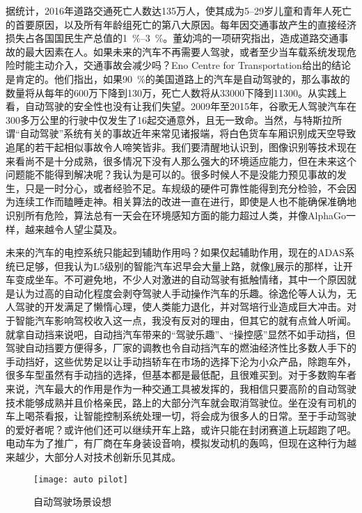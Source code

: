 \documentclass[UTF8]{ctexart}
\numberwithin{figure}{section}
\numberwithin{table}{section}
\begin{document}
据统计，2016年道路交通死亡人数达135万人，使其成为\numrange[range-phrase = $\,\sim\,$]{5}{29}岁儿童和青年人死亡的首要原因，以及所有年龄组死亡的第八大原因。每年因交通事故产生的直接经济损失占各国国民生产总值的\qtyrange[range-phrase = $\,\sim\,$, range-units = single]{1}{3}{\percent}。董幼鸿的一项研究指出，造成道路交通事故的最大因素在人。如果未来的汽车不再需要人驾驶，或者至少当车载系统发现危险时能主动介入，交通事故会减少吗？Eno Centre for Transportation给出的结论是肯定的。他们指出，如果\SI{90}{\percent}的美国道路上的汽车是自动驾驶的，那么事故的数量将从每年的600万下降到130万，死亡人数将从\num[group-separator={,}]{33000}下降到\num[group-separator={,}]{11300}。从实践上看，自动驾驶的安全性也没有让我们失望。2009年至2015年，谷歌无人驾驶汽车在300多万公里的行驶中仅发生了16起交通意外，且无一致命。当然，与特斯拉所谓“自动驾驶”系统有关的事故近年来常见诸报端，将白色货车车厢识别成天空导致追尾的若干起相似事故令人啼笑皆非。我们要清醒地认识到，图像识别等技术现在来看尚不是十分成熟，很多情况下没有人那么强大的环境适应能力，但在未来这个问题能不能得到解决呢？我认为是可以的。很多时候人不是没能力预见事故的发生，只是一时分心，或者经验不足。车规级的硬件可靠性能得到充分检验，不会因为连续工作而瞌睡走神。相关算法的改进一直在进行，即使是人也不能确保准确地识别所有危险，算法总有一天会在环境感知方面的能力超过人类，并像AlphaGo一样，越来越令人望尘莫及。

未来的汽车的电控系统只能起到辅助作用吗？如果仅起辅助作用，现在的ADAS系统已足够，但我认为L5级别的智能汽车迟早会大量上路，就像\cref{auto pilot}展示的那样，让开车变成坐车。不可避免地，不少人对激进的自动驾驶有抵触情绪，其中一个原因就是认为过高的自动化程度会剥夺驾驶人手动操作汽车的乐趣。徐逸伦等人认为，无人驾驶的开发满足了懒惰心理，使人类能力退化，并对驾培行业造成巨大冲击。对于智能汽车影响驾校收入这一点，我没有反对的理由，但其它的就有点耸人听闻。就拿自动挡来说吧，自动挡汽车带来的“驾驶乐趣”、“操控感”显然不如手动挡，但驾驶自动挡要方便得多，厂家的调教也令自动挡汽车的燃油经济性比多数人手下的手动挡好，这些优势足以让手动挡轿车在市场的选择下沦为小众产品，除跑车外，很多车型虽然有手动挡的选择，但基本都是最低配，且很难买到。对于多数购车者来说，汽车最大的作用是作为一种交通工具被发挥的，我相信只要高阶的自动驾驶技术能够成熟并且价格亲民，路上的大部分汽车就会取消驾驶位。坐在没有司机的车上喝茶看报，让智能控制系统处理一切，将会成为很多人的日常。至于手动驾驶的爱好者呢？或许他们还可以继续开车上路，或许只能在封闭赛道上玩超跑了吧。电动车为了推广，有厂商在车身装设音响，模拟发动机的轰鸣，但现在这种行为越来越少，大部分人对技术创新乐见其成。

\begin{figure}[htbp]
	\centering
	\begin{minipage}[b]{0.6\textwidth}
		\centering
		\texttt{[image: auto pilot]}
		\caption{自动驾驶场景设想}
		\label{auto pilot}
	\end{minipage}
\end{figure}
\end{document}
